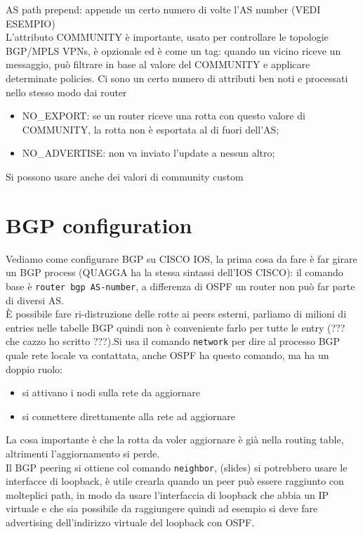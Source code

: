 \documentclass[12pt, oneside]{extbook} %
\begin{document}
AS path prepend: appende un certo numero di volte l'AS number (VEDI ESEMPIO)\\
L'attributo COMMUNITY è importante, usato per controllare le topologie BGP/MPLS VPNs, è opzionale ed è come un tag: quando un vicino riceve un messaggio, può filtrare in base al valore del COMMUNITY e applicare determinate policies. Ci sono un certo numero di attributi ben noti e processati nello stesso modo dai router
\begin{itemize}
\item NO\_EXPORT: se un router riceve una rotta con questo valore di COMMUNITY, la rotta non è esportata al di fuori dell'AS;
\item NO\_ADVERTISE: non va inviato l'update a nessun altro;
\end{itemize}
Si possono usare anche dei valori di community custom
\section{BGP configuration} 
Vediamo come configurare BGP su CISCO IOS, la prima cosa da fare è far girare un BGP process (QUAGGA ha la stessa sintassi dell'IOS CISCO): il comando base è \texttt{router bgp AS-number}, a differenza di OSPF un router non può far parte di diversi AS.\\È possibile fare ri-distruzione delle rotte ai peers esterni, parliamo di milioni di entries nelle tabelle BGP quindi non è conveniente farlo per tutte le entry (??? che cazzo ho scritto ???).Si usa il comando \texttt{network} per dire al processo BGP quale rete locale va contattata, anche OSPF ha questo comando, ma ha un doppio ruolo:
\begin{itemize}
\item si attivano i nodi sulla rete da aggiornare
\item si connettere direttamente alla rete ad aggiornare
\end{itemize}
La cosa importante è che la rotta da voler aggiornare è già nella routing table, altrimenti l'aggiornamento si perde.\\Il BGP peering si ottiene col comando \texttt{neighbor}, (slides) si potrebbero usare le interfacce di loopback, è utile crearla quando un peer può essere raggiunto con molteplici path, in modo da usare l'interfaccia di loopback che abbia un IP virtuale e che sia possibile da raggiungere quindi ad esempio si deve fare advertising dell'indirizzo virtuale del loopback con OSPF.
\end{document}
